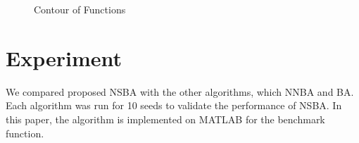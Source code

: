 \begin{figure}[h]
\centering
{}

\caption{Contour of Functions}
\label{fig:cf}
\end{figure}

\section{Experiment}
 We compared proposed NSBA with the other algorithms, which NNBA and BA. Each algorithm was run for 10 seeds to validate the performance of NSBA. In this paper, the algorithm is implemented on MATLAB for the benchmark function.

